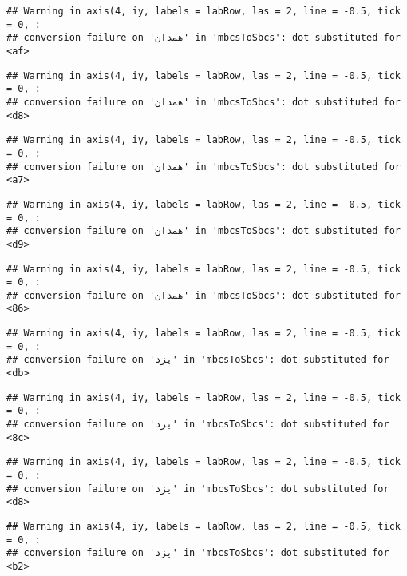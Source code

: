 \documentclass[
]{article}
\begin{document}
\begin{verbatim}
## Warning in axis(4, iy, labels = labRow, las = 2, line = -0.5, tick = 0, :
## conversion failure on 'همدان' in 'mbcsToSbcs': dot substituted for <af>
\end{verbatim}

\begin{verbatim}
## Warning in axis(4, iy, labels = labRow, las = 2, line = -0.5, tick = 0, :
## conversion failure on 'همدان' in 'mbcsToSbcs': dot substituted for <d8>
\end{verbatim}

\begin{verbatim}
## Warning in axis(4, iy, labels = labRow, las = 2, line = -0.5, tick = 0, :
## conversion failure on 'همدان' in 'mbcsToSbcs': dot substituted for <a7>
\end{verbatim}

\begin{verbatim}
## Warning in axis(4, iy, labels = labRow, las = 2, line = -0.5, tick = 0, :
## conversion failure on 'همدان' in 'mbcsToSbcs': dot substituted for <d9>
\end{verbatim}

\begin{verbatim}
## Warning in axis(4, iy, labels = labRow, las = 2, line = -0.5, tick = 0, :
## conversion failure on 'همدان' in 'mbcsToSbcs': dot substituted for <86>
\end{verbatim}

\begin{verbatim}
## Warning in axis(4, iy, labels = labRow, las = 2, line = -0.5, tick = 0, :
## conversion failure on 'یزد' in 'mbcsToSbcs': dot substituted for <db>
\end{verbatim}

\begin{verbatim}
## Warning in axis(4, iy, labels = labRow, las = 2, line = -0.5, tick = 0, :
## conversion failure on 'یزد' in 'mbcsToSbcs': dot substituted for <8c>
\end{verbatim}

\begin{verbatim}
## Warning in axis(4, iy, labels = labRow, las = 2, line = -0.5, tick = 0, :
## conversion failure on 'یزد' in 'mbcsToSbcs': dot substituted for <d8>
\end{verbatim}

\begin{verbatim}
## Warning in axis(4, iy, labels = labRow, las = 2, line = -0.5, tick = 0, :
## conversion failure on 'یزد' in 'mbcsToSbcs': dot substituted for <b2>
\end{verbatim}
\end{document}
